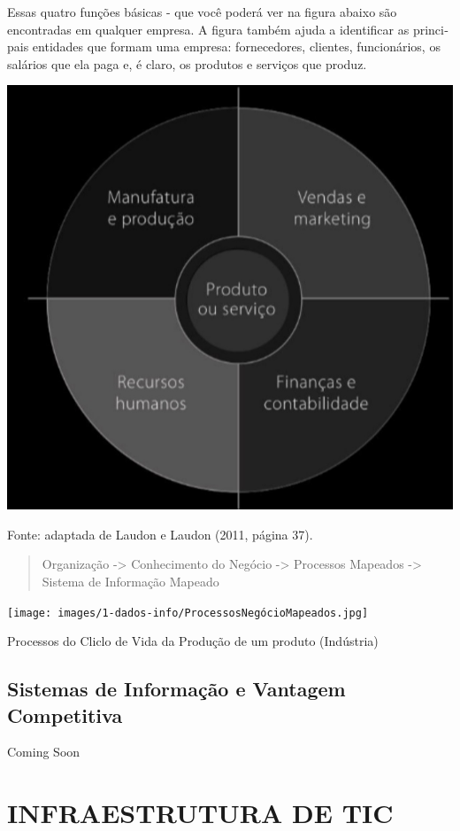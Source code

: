 \documentclass[
]{book}
\begin{document}
Essas quatro funções básicas - que você poderá ver na figura abaixo são encontradas em qualquer empresa. A figura também ajuda a identificar as princi­ pais entidades que formam uma empresa: fornecedores, clientes, funcionários, os salários que ela paga e, é claro, os produtos e serviços que produz.

\includegraphics{images/1-dados-info/AreasBasicasEmpresa.jpg}

Fonte: adaptada de Laudon e Laudon (2011, página 37).

\begin{quote}
Organização -\textgreater{} Conhecimento do Negócio -\textgreater{} Processos Mapeados -\textgreater{} Sistema de Informação Mapeado
\end{quote}

\texttt{[image: images/1-dados-info/ProcessosNegócioMapeados.jpg]}

Processos do Cliclo de Vida da Produção de um produto (Indústria)

\section{Sistemas de Informação e Vantagem Competitiva}\label{sistemas-de-informauxe7uxe3o-e-vantagem-competitiva}

Coming Soon

\chapter{INFRAESTRUTURA DE TIC}\label{infraestrutura-de-tic}
\end{document}
